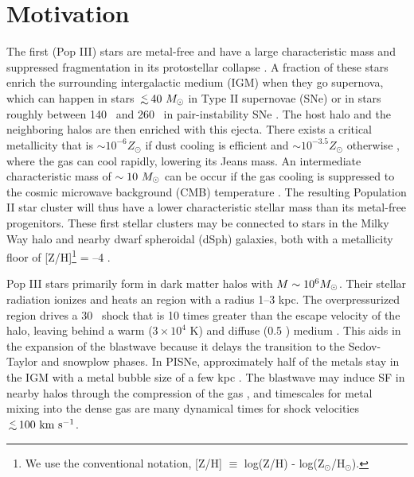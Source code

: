 \documentclass[apjl]{emulateapj}
\begin{document}

\section{Motivation}

The first (Pop III) stars are metal-free and have a large
characteristic mass and suppressed fragmentation in its protostellar
collapse \citep{ABN02, Bromm02_P3, OShea07a}.  A fraction of these
stars enrich the surrounding intergalactic medium (IGM) when they go
supernova, which can happen in stars $\lsim 40~\Ms$ in Type II
supernovae (SNe) or in stars roughly between 140 \Ms~and 260 \Ms~in
pair-instability SNe \citep[PISNe;][]{2002ApJ...567..532H}.  The host
halo and the neighboring halos are then enriched with this ejecta.
There exists a critical metallicity that is $\sim 10^{-6} Z_\odot$ if
dust cooling is efficient \citep{Omukai05, Schneider06_Frag, clark08}
and $\sim 10^{-3.5} Z_\odot$ otherwise \citep{Bromm01,
  2009ApJ...691..441S}, where the gas can cool rapidly, lowering its
Jeans mass.  An intermediate characteristic mass of $\sim10~\Ms$ can
be occur if the gas cooling is suppressed to the cosmic microwave
background (CMB) temperature \citep{Larson98, Tumlinson07_IMF,
  2009ApJ...691..441S}.  The resulting Population II star cluster will
thus have a lower characteristic stellar mass than its metal-free
progenitors.  These first stellar clusters may be connected to stars
in the Milky Way halo and nearby dwarf spheroidal (dSph) galaxies,
both with a metallicity floor of [Z/H]\footnote{We use the
  conventional notation, [Z/H] $\equiv$ log(Z/H) -
  log(Z$_\odot$/H$_\odot$).} = --4 \citep{Beers05, Tafelmeyer10,
  Frebel10_Obs}.

Pop III stars primarily form in dark matter halos with $M \sim 10^6
\Ms$.  Their stellar radiation ionizes and heats an  region
with a radius 1--3 kpc.  The overpressurized  region drives
a 30 \kms~shock that is 10 times greater than the escape velocity of
the halo, leaving behind a warm ($3 \times 10^4$ K) and diffuse (0.5
\cubecm) medium \citep{Kitayama04, Whalen04, Abel07}.  This aids in
the expansion of the blastwave because it delays the transition to the
Sedov-Taylor and snowplow phases.  In PISNe, approximately half of the
metals stay in the IGM with a metal bubble size of a few kpc
\citep{Wise08_Gal, Greif10}.  The blastwave may induce SF in nearby
halos through the compression of the gas \citep{Ferrara98}, and
timescales for metal mixing into the dense gas are many dynamical
times \citep{Cen08} for shock velocities $\lsim100~\kms$.
\end{document}
